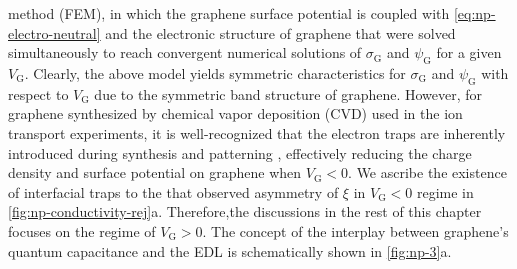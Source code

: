 method (FEM), in which the graphene surface potential is coupled with
\autoref{eq:np-electro-neutral} and the electronic structure of
graphene that were solved simultaneously to reach convergent numerical
solutions of $\sigma_{\mathrm{G}}$ and $\psi_{\mathrm{G}}$ for a given
$V_{\mathrm{G}}$. Clearly, the above model yields symmetric
characteristics for $\sigma_{\mathrm{G}}$ and $\psi_{\mathrm{G}}$ with
respect to $V_{\mathrm{G}}$ due to the symmetric band structure of
graphene.
%
However, for graphene
synthesized by chemical vapor deposition (CVD) used in the ion transport
experiments, it is well-recognized that the electron traps are
inherently introduced during synthesis and patterning
\autocite{Dean_2010_BN_gr_highquality}, effectively reducing the charge
density and surface potential on graphene when $V_{\mathrm{G}}<0$.
%
We ascribe the existence of interfacial traps to the
that observed asymmetry of $\xi$ in  $V_{\mathrm{G}}<0$ regime
in \autoref{fig:np-conductivity-rej}a.
%
%
Therefore,the discussions in the rest of this chapter focuses on the
regime of $V_{\mathrm{G}}>0$. The concept of the interplay between graphene's quantum capacitance and the EDL is schematically shown in \autoref{fig:np-3}a.


